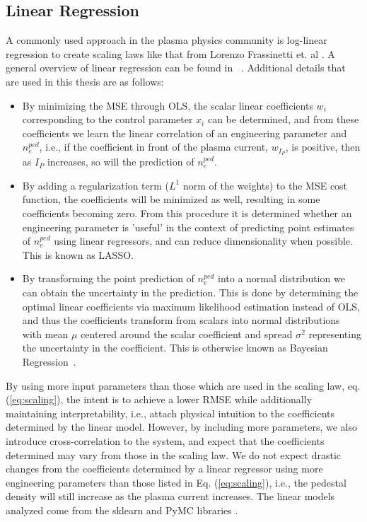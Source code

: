 \documentclass[a4paper, twoside, final, 12pt]{article}
\begin{document}
\subsection{Linear Regression}
A commonly used approach in the plasma physics community is log-linear regression to create scaling laws like that from Lorenzo Frassinetti et. al \cite{Frassinetti_2020}.
A general overview of linear regression can be found in ~\cite{hastie01statisticallearning}. 
Additional details that are used in this thesis are as follows: 
\begin{itemize}
	\item By minimizing the MSE through OLS, the scalar linear coefficients $w_i$ corresponding to the control parameter $x_i$ can be determined, and from these coefficients we learn the linear correlation of an engineering parameter and $n_e^{ped}$, i.e., if the coefficient in front of the plasma current, $w_{I_P}$, is positive, then as $I_P$ increases, so will the prediction of $n_e^{ped}$.
	\item By adding a regularization term ($L^1$ norm of the weights) to the MSE cost function, the coefficients will be minimized as well, resulting in some coefficients becoming zero. From this procedure it is determined whether an engineering parameter is 'useful' in the context of predicting point estimates of $n_e^{ped}$ using linear regressors, and can reduce dimensionality when possible. This is known as LASSO. \cite{Bisong2019, LASSO_OG, LASSO_COIN}
	\item By transforming the point prediction of $n_e^{ped}$  into a normal distribution we can obtain the uncertainty in the prediction. This is done by determining the optimal linear coefficients via maximum likelihood estimation instead of OLS, and thus the coefficients transform from scalars into normal distributions with mean $\mu$ centered around the scalar coefficient and spread $\sigma^2$ representing the uncertainty in the coefficient. This is otherwise known as Bayesian Regression~\cite{bayes_regr}.
\end{itemize}

By using more input parameters than those which are used in the scaling law, eq. (\ref{eq:scaling}), the intent is to achieve a lower RMSE while additionally maintaining interpretability, i.e., attach physical intuition to the coefficients determined by the linear model. However, by including more parameters, we also introduce cross-correlation to the system, and expect that the coefficients determined may vary from those in the scaling law. We do not expect drastic changes from the coefficients determined by a linear regressor using more engineering parameters than those listed in Eq. (\ref{eq:scaling}), i.e., the pedestal density will still increase as the plasma current increases.  The linear models analyzed come from the sklearn and PyMC libraries \cite{scikit-learn, Salvatier2016}. 
\end{document}
